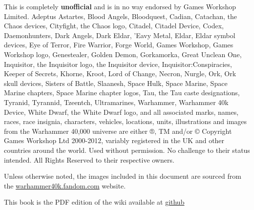This is completely \textbf{unofficial} and is in no way endorsed by Games Workshop Limited. Adeptus Astartes, Blood Angels, Bloodquest, Cadian, Catachan, the Chaos devices, Cityfight, the Chaos logo, Citadel, Citadel Device, Codex, Daemonhunters, Dark Angels, Dark Eldar, 'Eavy Metal, Eldar, Eldar symbol devices, Eye of Terror, Fire Warrior, Forge World, Games Workshop, Games Workshop logo, Genestealer, Golden Demon, Gorkamorka, Great Unclean One, Inquisitor, the Inquisitor logo, the Inquisitor device, Inquisitor:Conspiracies, Keeper of Secrets, Khorne, Kroot, Lord of Change, Necron, Nurgle, Ork, Ork skull devices, Sisters of Battle, Slaanesh, Space Hulk, Space Marine, Space Marine chapters, Space Marine chapter logos, Tau, the Tau caste designations, Tyranid, Tyrannid, Tzeentch, Ultramarines, Warhammer, Warhammer 40k Device, White Dwarf, the White Dwarf logo, and all associated marks, names, races, race insignia, characters, vehicles, locations, units, illustrations and images from the Warhammer 40,000 universe are either ®, TM and/or © Copyright Games Workshop Ltd 2000-2012, variably registered in the UK and other countries around the world. Used without permission. No challenge to their status intended. All Rights Reserved to their respective owners.

Unless otherwise noted, the images included in this document are sourced from the \href{https://warhammer40k.fandom.com}{warhammer40k.fandom.com} website.

This book is the PDF edition of the wiki available at \href{https://drdam.github.io/dnd2w40k/}{github}

\clearpage

